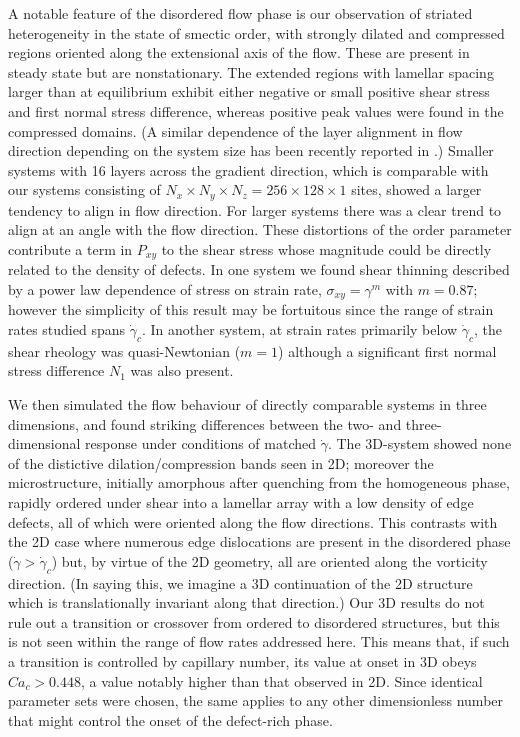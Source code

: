 \documentclass[8.5pt,twoside,twocolumn]{article}
\begin{document}
A notable feature of the disordered flow phase is our observation of striated heterogeneity in the state of smectic order, with strongly dilated and compressed regions oriented along the extensional axis of the flow.  These are present in steady state but are nonstationary. The extended regions with lamellar spacing larger than at equilibrium exhibit either negative or small positive shear stress and first normal stress difference, whereas positive peak values were found in the compressed domains.
(A similar dependence of the layer alignment in flow direction depending on the system size has been recently reported in \cite{Kumaran2011}.)
Smaller systems with 16 layers across the gradient direction, which is comparable with our systems consisting of  $N_x\times N_y \times N_z=256\times128\times1$ sites, showed a larger tendency to align in flow direction.
For larger systems there was a clear trend to align at an angle with the flow direction.
These distortions of the order parameter contribute a term in $P_{xy}$ to the shear stress whose magnitude could be directly related to the density of defects. In one system we found shear thinning described by a power law dependence of stress on strain rate, $\sigma_{xy}=\gamma^m$ with $m=0.87$; however the simplicity of this result may be fortuitous since the range of strain rates studied spans $\dot\gamma_c$. In another system, at strain rates primarily below $\dot\gamma_c$, the shear rheology was quasi-Newtonian ($m=1$) although a significant first normal stress difference $N_1$ was also present.

We then simulated the flow behaviour of directly comparable systems in three dimensions, and found striking differences between the two- and three-dimensional response under conditions of matched $\dot\gamma$. The 3D-system showed none of the distictive dilation/compression bands seen in 2D; moreover the microstructure, initially amorphous after quenching from the homogeneous phase, rapidly ordered under shear into a lamellar array with a low density of edge defects, all of which were oriented along the flow directions. This contrasts with the 2D case where numerous edge dislocations are present in the disordered phase ($\dot\gamma > \dot\gamma_c$) but, by virtue of the 2D geometry, all are oriented along the vorticity direction. (In saying this, we imagine a 3D continuation of the 2D structure which is translationally invariant along that direction.) Our 3D results do not rule out a transition or crossover from ordered to disordered structures, but this is not seen within the range of flow rates addressed here. This means that, if such a transition is controlled by capillary number, its value at onset in 3D obeys $Ca_c>0.448$, a value notably higher than that observed in 2D. Since identical parameter sets were chosen, the same applies to any other dimensionless number that might control the onset of the defect-rich phase. 
\end{document}
